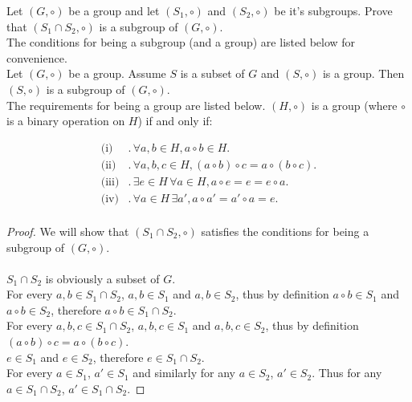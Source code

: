 \documentclass[addpoints]{exam}
\begin{document}
\begin{questions}
\question[2] Let $(G,\circ)$ be a group and let $(S_{1},\circ)$ and $(S_{2},\circ)$ be it's subgroups. Prove that $(S_{1}\cap S_{2},\circ)$ is a subgroup of $(G,\circ)$.\\

The conditions for being a subgroup (and a group) are listed below for convenience.\\
Let $(G,\circ)$ be a group. Assume $S$ is a subset of $G$ and $(S,\circ)$ is a group. Then $(S,\circ)$ is a subgroup of $(G,\circ)$.\\
The requirements for being a group are listed below. $(H,\circ)$ is a group (where $\circ$ is a binary operation on $H$) if and only if:

\begin{align*}
\textrm{(i)}&.\,\forall a,b\in H, a\circ b\in H.\\
\textrm{(ii)}&.\,\forall a,b,c\in H, (a\circ b)\circ c=a\circ(b\circ c).\\
\textrm{(iii)}&.\,\exists e\in H\,\forall a\in H, a\circ e=e=e\circ a.\\
\textrm{(iv)}&.\,\forall a\in H\,\exists a', a\circ a'=a'\circ a=e.\\
\end{align*}

\begin{solution}
\begin{proof}
We will show that $(S_{1}\cap S_{2},\circ)$ satisfies the conditions for being a subgroup of $(G,\circ)$.\\
\\
$S_{1}\cap S_{2}$ is obviously a subset of $G$.
\\
For every $a,b\in S_{1}\cap S_{2}$, $a,b\in S_{1}$ and $a,b\in S_{2}$, thus by definition $a\circ b\in S_{1}$ and $a\circ b\in S_{2}$, therefore $a\circ b\in S_{1}\cap S_{2}$.\\
For every $a,b,c\in S_{1}\cap S_{2}$, $a,b,c\in S_{1}$ and $a,b,c\in S_{2}$, thus by definition $(a\circ b)\circ c=a\circ(b\circ c)$.\\
$e\in S_{1}$ and $e\in S_{2}$, therefore $e\in S_{1}\cap S_{2}$.\\
For every $a\in S_{1}$, $a'\in S_{1}$ and similarly for any $a\in S_{2}$, $a'\in S_{2}$. Thus for any $a\in S_{1}\cap S_{2}$, $a'\in S_{1}\cap S_{2}$.
\end{proof}
\end{solution}




\end{questions}
\end{document}
